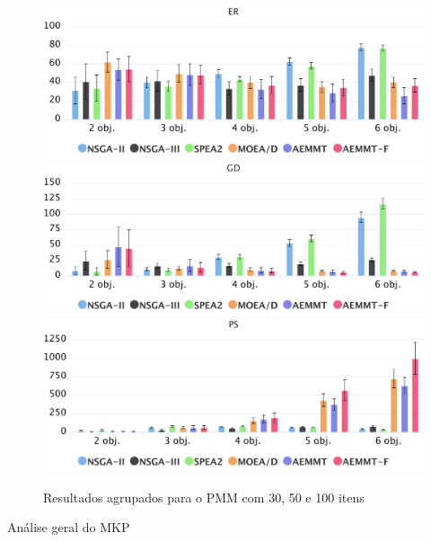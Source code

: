 \begin{figure}[!htbp]
	\caption{Resultados agrupados para o PMM com 30, 50 e 100 itens}
	\label{fig_exp1_mkp_todos}
	\includegraphics[width=1\textwidth]{cap_experimentos/figs/er-mkp-todos}
	\includegraphics[width=1\textwidth]{cap_experimentos/figs/gd-mkp-todos}
	\includegraphics[width=1\textwidth]{cap_experimentos/figs/ps-mkp-todos}
\end{figure}

Análise geral do MKP

